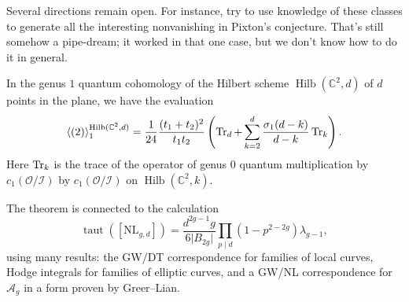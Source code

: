 \documentclass[reqno]{amsart} 
\begin{document}
Several directions remain open.  For instance, try to use knowledge of these classes to generate all the interesting nonvanishing in Pixton's conjecture.  That's still somehow a pipe-dream; it worked in that one case, but we don't know how to do it in general.

\begin{theorem}
  In the genus $1$ quantum cohomology of the Hilbert scheme $\operatorname{Hilb}(\mathbb{C}^2, d)$ of $d$ points in the plane, we have the evaluation
  \begin{equation*}
    \left\langle(2) \right\rangle_1^{\operatorname{Hilb}(\mathbb{C}^2, d)}
    = \frac{1}{24}
    \frac{(t_1 + t_2)^2}{ t_1 t_2}
    \left( \operatorname{Tr}_d + \sum_{k = 2}^{d}
      \frac{\sigma_1(d - k)}{ d - k} \operatorname{Tr}_k\right).
  \end{equation*}
  Here $\operatorname{Tr}_k$ is the trace of the operator of genus $0$ quantum multiplication by $c_1(\mathcal{O} / \mathcal{I})$ by $c_1(\mathcal{O} / \mathcal{I})$ on $\operatorname{Hilb}(\mathbb{C}^2, k)$.
\end{theorem}

The theorem is connected to the calculation
\begin{equation*}
  \operatorname{taut}([\mathrm{N L}_{g, d}]) =
  \frac{d^{2 g - 1} g}{ 6 \lvert B_{2 g} \rvert}
  \prod_{p \mid d}
  (1 - p^{2 - 2 g}) \lambda_{g - 1},
\end{equation*}
using many results: the GW/DT correspondence for families of local curves, Hodge integrals for families of elliptic curves, and a GW/NL correspondence for $\mathcal{A}_g$ in a form proven by Greer--Lian.

{} 
\end{document}
